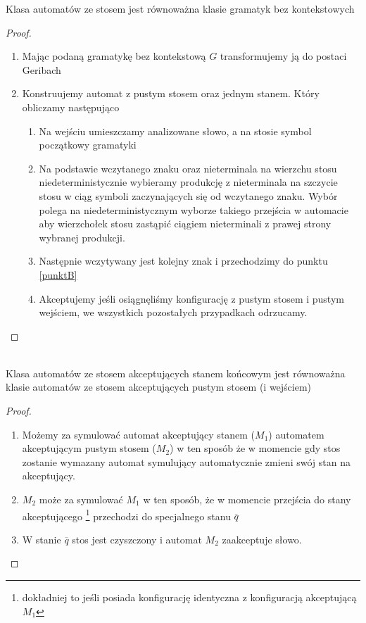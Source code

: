 \begin{tw}
	Klasa automatów ze stosem jest równoważna klasie gramatyk bez kontekstowych
	\begin{proof}
	\begin{enumerate}
		\item Mając podaną gramatykę bez kontekstową $G$ transformujemy ją do postaci Geribach
		\item Konstruujemy automat z pustym stosem oraz jednym stanem. Który obliczamy następująco
			\begin{enumerate}
				\item Na wejściu umieszczamy analizowane słowo, a na stosie symbol początkowy gramatyki
				\item Na podstawie wczytanego znaku oraz nieterminala na wierzchu stosu niedeterministycznie
				wybieramy produkcję z nieterminala na szczycie stosu w ciąg symboli zaczynających się
				od wczytanego znaku.
				Wybór polega na niedeterministycznym wyborze takiego przejścia w automacie aby wierzchołek
				stosu zastąpić ciągiem nieterminali z prawej strony wybranej produkcji. \label{punktB}
				\item Następnie wczytywany jest kolejny znak i przechodzimy do punktu \ref{punktB}
				\item Akceptujemy jeśli osiągnęliśmy konfigurację z pustym stosem i pustym wejściem, we
				wszystkich pozostałych przypadkach odrzucamy.
			\end{enumerate}
	\end{enumerate}		
	\end{proof}
\end{tw}

\begin{tw}~\\
	Klasa automatów ze stosem akceptujących stanem końcowym jest równoważna klasie automatów ze stosem
	akceptujących pustym stosem (i wejściem)
	\begin{proof}
		\begin{enumerate}
			\item Możemy za symulować automat akceptujący stanem ($M_1$) automatem akceptującym pustym stosem ($M_2$)
			w ten sposób że w momencie gdy stos zostanie wymazany automat
			symulujący automatycznie zmieni swój stan na akceptujący.
			\item $M_2$ może za symulować $M_1$ w ten sposób, że w momencie przejścia do stany akceptującego
			\footnote{dokładniej to jeśli posiada konfigurację identyczna z konfiguracją akceptującą $M_1$}
			przechodzi do specjalnego stanu $\overline{q}$
			\item W stanie $\overline{q}$ stos jest czyszczony i automat $M_2$ zaakceptuje słowo.
		\end{enumerate}
	\end{proof}
\end{tw}

